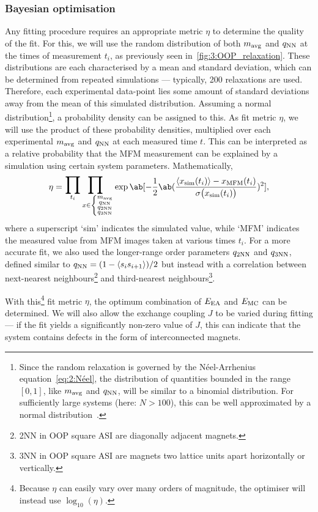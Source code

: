 \subsubsection{Bayesian optimisation}
Any fitting procedure requires an appropriate metric $\eta$ to determine the quality of the fit.
For this, we will use the random distribution of both $\mavg$ and $\qNN$ at the times of measurement $t_i$, as previously seen in~\cref{fig:3:OOP_relaxation}.
These distributions are each characterised by a mean and standard deviation, which can be determined from repeated simulations --- typically, 200 relaxations are used. %
Therefore, each experimental data-point lies some amount of standard deviations away from the mean of this simulated distribution.
Assuming a normal distribution\footnote{
	Since the random relaxation is governed by the N\'eel-Arrhenius equation~\eqref{eq:2:Néel}, the distribution of quantities bounded in the range $[0,1]$, like $\mavg$ and $\qNN$, will be similar to a binomial distribution.
	For sufficiently large systems (here: $N > 100$), this can be well approximated by a normal distribution~\cite{DeMoivreLaplaceTheorem}.
}, a probability density can be assigned to this.
As fit metric $\eta$, we will use the product of these probability densities, multiplied over each experimental $\mavg$ and $\qNN$ at each measured time $t$.
This can be interpreted as a relative probability that the MFM measurement can be explained by a simulation using certain system parameters.
Mathematically,
\begin{equation}
	\eta = \bigprod_{t_i} \bigprod_{x \in \left\{\substack{\mavg\\\qNN\\\qNN[2]\\\qNN[3]}\right.} \exp\ab[-\frac{1}{2} \ab(\frac{\langle x_\mathrm{sim}(t_i) \rangle - x_\mathrm{MFM}(t_i)}{\sigma\big(x_\mathrm{sim}(t_i)\big)})^2] \mathrm{,}
\end{equation}
where a superscript `sim' indicates the simulated value, while `MFM' indicates the measured value from MFM images taken at various times $t_i$.
For a more accurate fit, we also used the longer-range order parameters $\qNN[2]$ and $\qNN[3]$, defined similar to $\qNN = (1 - \langle s_i s_{i+1} \rangle)/2$ but instead with a correlation between next-nearest neighbours\footnote{
	2NN in OOP square ASI are diagonally adjacent magnets.
} and third-nearest neighbours\footnote{
	3NN in OOP square ASI are magnets two lattice units apart horizontally or vertically.
}. \par
With this\footnote{
	Because $\eta$ can easily vary over many orders of magnitude, the optimiser will instead use $\log_{10}(\eta)$.
} fit metric $\eta$, the optimum combination of $\EEA$ and $\EMC$ can be determined.
We will also allow the exchange coupling $J$ to be varied during fitting --- if the fit yields a significantly non-zero value of $J$, this can indicate that the system contains defects in the form of interconnected magnets. \par %

